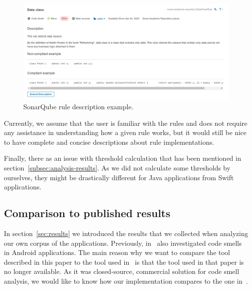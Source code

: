 \begin{figure}
    \includegraphics[scale=0.45]{figures/sonarqube_description.png}
    \caption{SonarQube rule description example.}
    \label{fig:sonarqube_description_example}
\end{figure}

Currently, we assume that the user is familiar with the rules and does not require any assistance in understanding how
a given rule works, but it would still be nice to have complete and concise descriptions about rule implementations.

Finally, there as an issue with threshold calculation that has been mentioned in section~\ref{subsec:analysis-results}.
As we did not calculate some thresholds by ourselves, they might be drastically different for Java applications from
Swift applications.

\FloatBarrier

\subsection{Comparison to published results}\label{subsec:comparison-to-published-results}


In section~\ref{sec:results} we introduced the results that we collected when analyzing our own corpus
of the applications.
Previously, \citeauthor{mannan2016understanding} in~\cite{mannan2016understanding} also investigated code smells in
Android applications.
The main reason why we want to compare the tool described in this paper to the tool used in~\cite{mannan2016understanding}
is that the tool used in that paper is no longer available.
As it was closed-source, commercial solution for code smell analysis, we would like to know how our implementation
compares to the one in~\cite{mannan2016understanding}.

